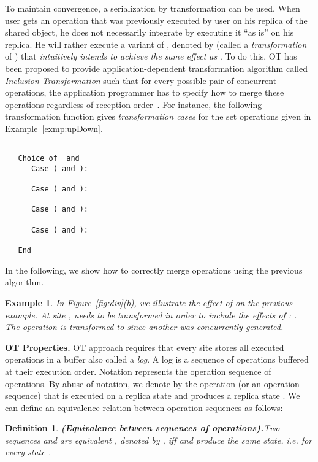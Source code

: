 \documentclass[submission,copyright,creativecommons]{eptcs}
\newtheorem{example}{Example}
\newtheorem{definition}{Definition}
\begin{document}
To maintain convergence, a serialization by transformation can be used. When  user   gets an operation  that
was previously executed  by  user  on  his replica of the
shared  object,   he  does  not  necessarily  integrate   by
executing it  ``as is''   on  his replica. He will rather  execute a
variant  of ,  denoted by   (called  a \emph{transformation} of
) that  \textit{intuitively intends to achieve the  same effect as
  }.
 To do this, OT has been proposed to provide
application-dependent  transformation algorithm called
\emph{Inclusion Transformation}  such  that for  every
possible pair of concurrent operations, the application programmer has to
specify  how to  merge these  operations regardless  of  reception 
order~\cite{Ellis89,Sun98,Sun.ea:98}.
For instance, the following transformation function gives \textit{transformation cases} for the set operations  given in Example~\ref{exmp:upDown}.\begin{small}
\begin{lstlisting}

   Choice of  and 
      Case ( and ):
                
      Case ( and ):
                
      Case ( and ):
                
      Case ( and ):
                
   End
\end{lstlisting}
\end{small}


\medskip
In the following, we show how to correctly merge operations using the previous algorithm. 
\begin{example}\label{exmp:e12}
In Figure~\ref{fig:div}(b),  we illustrate the effect of   on the
previous example. At site ,  needs
to    be    transformed   in order to include the effects of :
.  The  operation  is transformed to  since another   was concurrently generated.
\end{example}  





\noindent\textbf{OT Properties.} 
OT approach requires that every site stores all executed operations in a buffer also called a \emph{log}. A log is a sequence of operations buffered at their execution order.
Notation  represents the operation sequence of  operations.
By abuse of notation, we denote by  the operation (or an operation sequence)
 that is executed
on a replica state  and produces a replica state .  We can define an equivalence
relation between operation sequences as follows:
\begin{definition}\textbf{\emph{(Equivalence between sequences of operations).}}\label{Def:tequiv}
Two sequences  and  are \emph{equivalent }, denoted by
, iff  
  and  produce the same state, \textit{i.e.}  for every state . 
\end{definition}
\end{document}

